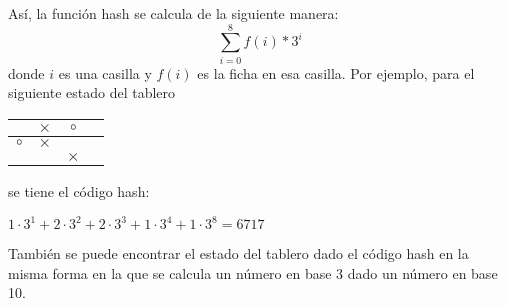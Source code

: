 \documentclass{article}
\begin{document}
Así, la función hash se calcula de la siguiente manera: \[\sum_{i=0}^8 f(i) * 3^i\] donde $i$ es una casilla y $f(i)$ es la ficha en esa casilla. Por ejemplo, para el siguiente estado del tablero

\begin{center}
\begin{tabular}{|c|c|c|c|}
\hline
 & $\times$ & $\circ$ \\ \hline
$\circ$ & $\times$ &  \\ \hline
 &  & $\times$ \\ \hline
\end{tabular}
\end{center}

se tiene el código hash:

$1 \cdot 3^1 + 2 \cdot 3^2 + 2 \cdot 3^3 + 1 \cdot 3^4 + 1 \cdot 3^8 = 6717$

También se puede encontrar el estado del tablero dado el código hash en la misma forma en la que se calcula un número en base 3 dado un número en base 10.
\end{document}
